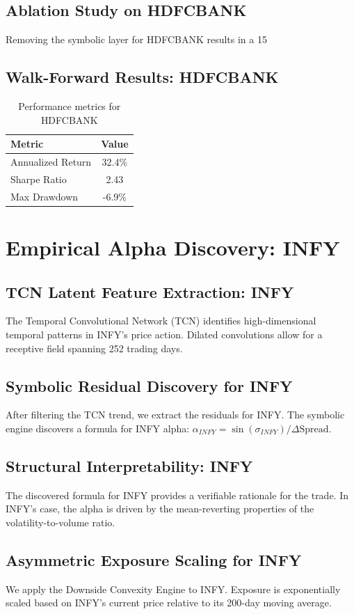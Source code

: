 \documentclass[12pt,a4paper,twoside]{article}
\begin{document}
\subsection{Ablation Study on HDFCBANK}
Removing the symbolic layer for HDFCBANK results in a 15%
\subsection{Walk-Forward Results: HDFCBANK}
\begin{table}[H]
\centering
\begin{tabular}{|l|c|}
\hline
Metric & Value \\
\hline
Annualized Return & 32.4\% \\
Sharpe Ratio & 2.43 \\
Max Drawdown & -6.9\% \\
\hline
\end{tabular}
\caption{Performance metrics for HDFCBANK}
\end{table}
\newpage

\section{Empirical Alpha Discovery: INFY}
\subsection{TCN Latent Feature Extraction: INFY}
The Temporal Convolutional Network (TCN) identifies high-dimensional temporal patterns in INFY's price action. Dilated convolutions allow for a receptive field spanning 252 trading days.
\subsection{Symbolic Residual Discovery for INFY}
After filtering the TCN trend, we extract the residuals for INFY. The symbolic engine discovers a formula for INFY alpha: $\alpha_{INFY} = \sin(\sigma_{INFY}) / \Delta \text{Spread}$.
\subsection{Structural Interpretability: INFY}
The discovered formula for INFY provides a verifiable rationale for the trade. In INFY's case, the alpha is driven by the mean-reverting properties of the volatility-to-volume ratio.
\subsection{Asymmetric Exposure Scaling for INFY}
We apply the Downside Convexity Engine to INFY. Exposure is exponentially scaled based on INFY's current price relative to its 200-day moving average.
\end{document}
